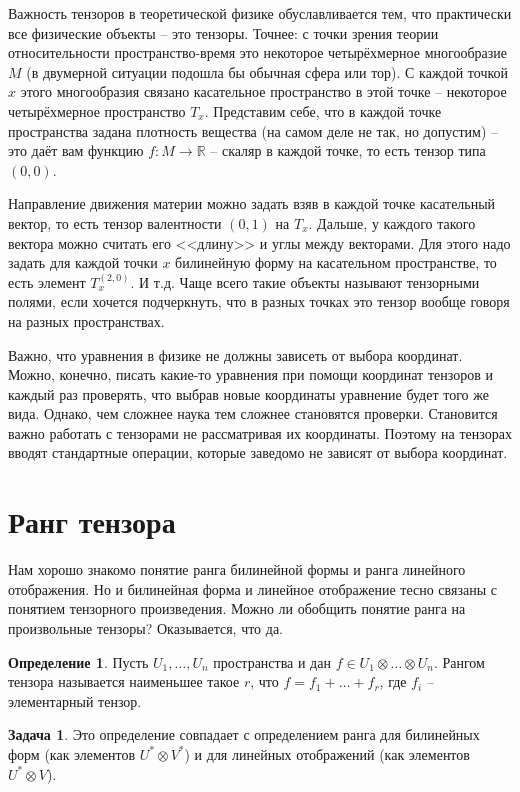 \documentclass[10pt,a4paper,oneside]{book}
\theoremstyle{definition}
\newtheorem{zad}{\color{violet!100!black}Задача}
\newtheorem*{defn}{\color{yellow!30!red} Определение}
\newcommand{\mb}[1]{\mathbb{#1}}
\def\dfn{\begin{defn}}
\def\edfn{\end{defn}}
\def\zd{\begin{zad}}
\def\ezd{\end{zad}}
\begin{document}
Важность тензоров в теоретической физике обуславливается тем, что практически все физические объекты -- это тензоры. Точнее: с точки зрения теории относительности пространство-время это некоторое четырёхмерное многообразие $M$ (в двумерной ситуации подошла бы обычная сфера или тор). С каждой точкой $x$ этого многообразия связано касательное пространство в этой точке -- некоторое четырёхмерное пространство $T_x$. Представим себе, что в каждой точке пространства задана плотность вещества (на самом деле не так, но допустим) -- это даёт вам функцию $f \colon M \to \mb R$ -- скаляр в каждой точке, то есть тензор типа $(0,0)$. 

Направление движения материи можно задать взяв в каждой точке касательный вектор, то есть тензор валентности $(0,1)$ на $T_x$. Дальше, у каждого такого вектора можно считать его <<длину>> и углы между векторами. Для этого надо задать для каждой точки $x$ билинейную форму на касательном пространстве, то есть элемент $T_x^{(2,0)}$. И т.д. Чаще всего такие объекты называют тензорными полями, если хочется подчеркнуть, что в разных точках это тензор вообще говоря на разных пространствах.

Важно, что уравнения в физике не должны зависеть от выбора координат. Можно, конечно, писать какие-то уравнения при помощи координат тензоров и каждый раз проверять, что выбрав новые координаты уравнение будет того же вида. Однако, чем сложнее наука тем сложнее становятся проверки. Становится важно работать с тензорами не рассматривая их координаты. Поэтому на тензорах вводят стандартные операции, которые заведомо не зависят от выбора координат.


\section{Ранг тензора}

Нам хорошо знакомо понятие ранга билинейной формы и ранга линейного отображения. Но и билинейная форма и линейное отображение тесно связаны с понятием тензорного произведения. Можно ли обобщить понятие ранга на произвольные тензоры? Оказывается, что да. 

\dfn Пусть $U_1,\dots, U_n$ пространства и дан $f\in U_1 \otimes \dots \otimes U_n$. Рангом тензора называется наименьшее такое $r$, что $f=f_1+\dots+f_r$, где $f_i$ -- элементарный тензор.
\edfn

\zd Это определение совпадает с определением ранга для билинейных форм (как элементов $U^*\otimes V^*$) и для линейных отображений (как элементов $U^* \otimes V$).
\ezd
\end{document}
